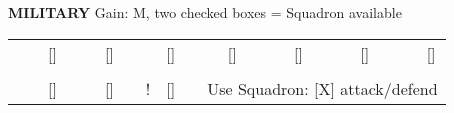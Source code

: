 \begin{flushleft}
  \textbf{MILITARY} \textcolor{supplemental}{Gain: M, two checked boxes = Squadron available}
\end{flushleft}
\begin{tabular}{ccccccccccccccccccccc}
\hhline{--~--~--~--~--~--~--~}
\multicolumn{1}{|c|}{\cellcolor{military}} &
  \multicolumn{1}{c|}{\cellcolor{military}} &
  \multicolumn{1}{c|}{{[}{]}} &
  \multicolumn{1}{c|}{\cellcolor{military}} &
  \multicolumn{1}{c|}{\cellcolor{military}} &
  \multicolumn{1}{c|}{{[}{]}} &
  \multicolumn{1}{c|}{\cellcolor{military}} &
  \multicolumn{1}{c|}{\cellcolor{military}} &
  \multicolumn{1}{c|}{{[}{]}} &
  \multicolumn{1}{c|}{\cellcolor{military}} &
  \multicolumn{1}{c|}{\cellcolor{military}} &
  \multicolumn{1}{c|}{{[}{]}} &
  \multicolumn{1}{c|}{\cellcolor{military}} &
  \multicolumn{1}{c|}{\cellcolor{military}} &
  \multicolumn{1}{c|}{{[}{]}} &
  \multicolumn{1}{c|}{\cellcolor{military}} &
  \multicolumn{1}{c|}{\cellcolor{military}} &
  \multicolumn{1}{c|}{{[}{]}} &
  \multicolumn{1}{c|}{\cellcolor{military}} &
  \multicolumn{1}{c|}{\cellcolor{military}} &
  {[}{]} \\ \cline{1-2} \cline{4-5} \cline{7-8} \cline{10-11} \cline{13-14} \cline{16-17} \cline{19-20}
 &
   &
   &
   &
   &
   &
   &
   &
   &
   &
   &
   &
   &
   &
   &
   &
   &
   &
   &
   &
   \\ \hhline{--~--~--~}
\multicolumn{1}{|c|}{\cellcolor{military}} &
  \multicolumn{1}{c|}{\cellcolor{military}} &
  \multicolumn{1}{c|}{{[}{]}} &
  \multicolumn{1}{c|}{\cellcolor{military}} &
  \multicolumn{1}{c|}{\cellcolor{military}} &
  \multicolumn{1}{c|}{{[}{]}} &
  \multicolumn{1}{c|}{\cellcolor{military}} &
  \multicolumn{1}{c|}{\cellcolor{military}!} &
  {[}{]} &
   &
  \multicolumn{11}{l}{{\color{supplemental}Use Squadron: {[}X{]} attack/defend}} \\ \cline{1-2} \cline{4-5} \cline{7-8}
\end{tabular}
